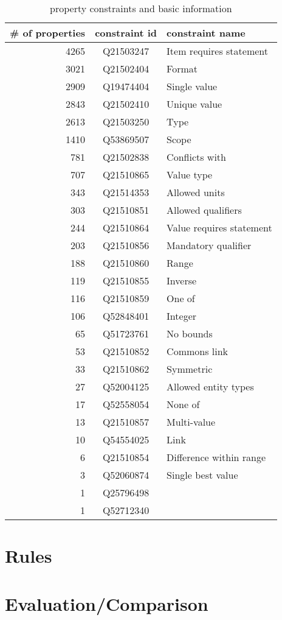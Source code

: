 \documentclass[hyperref,bachelorofscience]{cgvpub}
\begin{document}
\begin{table}[t]
\caption{property constraints and basic information}\label{tab_basestats}
\begin{tabular}{rcl}

\# of properties & constraint id & constraint name \\
\hline
4265 & Q21503247 & Item requires statement \\
3021 & Q21502404 & Format \\
2909 & Q19474404 & Single value \\
2843 & Q21502410 & Unique value \\
2613 & Q21503250 & Type \\
1410 & Q53869507 & Scope \\
781 & Q21502838 & Conflicts with \\
707 & Q21510865 & Value type \\
343 & Q21514353 & Allowed units \\
303 & Q21510851 & Allowed qualifiers \\
244 & Q21510864 & Value requires statement \\
203 & Q21510856 & Mandatory qualifier \\
188 & Q21510860 & Range \\
119 & Q21510855 & Inverse \\
116 & Q21510859 & One of \\
106 & Q52848401 & Integer \\
65 & Q51723761 & No bounds \\
53 & Q21510852 & Commons link \\
33 & Q21510862 & Symmetric \\
27 & Q52004125 & Allowed entity types \\
17 & Q52558054 & None of \\
13 & Q21510857 & Multi-value \\
10 & Q54554025 & Link \\
6 & Q21510854 & Difference within range \\
3 & Q52060874 & Single best value \\
1 & Q25796498 &  \\
1 & Q52712340 &  \\

\end{tabular}
\end{table}
\newpage



\chapter{Rules}
\chapter{Evaluation/Comparison}
\end{document}
